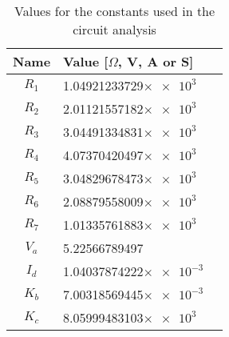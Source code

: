 \begin{table}[h]                             

\centering                                  %

\label{tab_1}                           
\def\arraystretch{1.1}                       %


\begin{tabular}{c|lr}                    %
\hline                                  %

\textbf{Name}  & \textbf{Value [$\Omega$, V, A or S]}\\     

\hline                                %
$R_1$          & 1.04921233729$\times \num{e3}$ \\ 
$R_2$          & 2.01121557182$\times \num{e3}$ \\ 
$R_3$          & 3.04491334831$\times \num{e3}$ \\ 
$R_4$          & 4.07370420497$\times \num{e3}$ \\
$R_5$          & 3.04829678473$\times \num{e3}$ \\
$R_6$          & 2.08879558009$\times \num{e3}$  \\ 
$R_7$          & 1.01335761883$\times \num{e3}$  \\
$V_a$          & 5.22566789497               \\
$I_d$          & 1.04037874222$\times \num{e-3}$ \\
$K_b$          & 7.00318569445$\times \num{e-3}$ \\ 
$K_c$          & 8.05999483103$\times \num{e3}$ \\
\hline                                %
\end{tabular}   
\caption{Values for the constants used in the circuit analysis}
\end{table}  
\FloatBarrier
